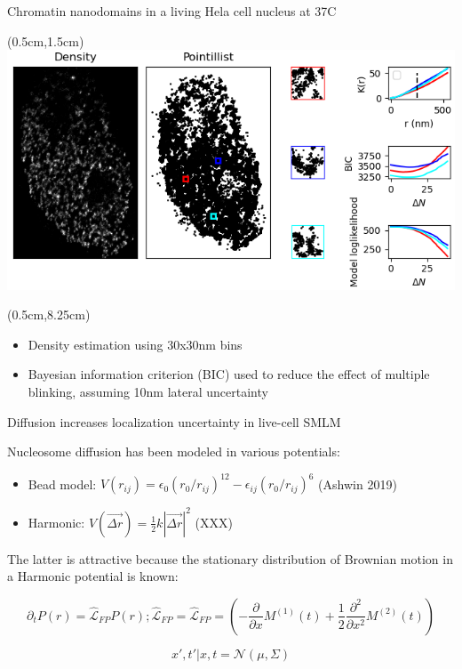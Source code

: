 \documentclass{beamer}					%
\begin{document}
\begin{frame}{Chromatin nanodomains in a living Hela cell nucleus at 37C}

\begin{textblock*}{13cm}(0.5cm,1.5cm)
\includegraphics[width=\textwidth]{Cluster.png}
\end{textblock*}

\begin{textblock*}{13cm}(0.5cm,8.25cm)
\begin{itemize}
\item Density estimation using 30x30nm bins
\item Bayesian information criterion (BIC) used to reduce the effect of multiple blinking, assuming 10nm lateral uncertainty
\end{itemize}
\end{textblock*}

\end{frame}

\begin{frame}{Diffusion increases localization uncertainty in live-cell SMLM}

Nucleosome diffusion has been modeled in various potentials:
\vspace{0.1in}
\begin{itemize}
\item Bead model: $V(r_{ij}) = \epsilon_{0}(r_{0}/r_{ij})^{12}-\epsilon_{ij}(r_{0}/r_{ij})^{6}$ (Ashwin 2019)
\item Harmonic: $V(\vec{\Delta r}) = \frac{1}{2}k|\vec{\Delta r}|^{2}$ (XXX)
\end{itemize}
\vspace{0.1in}
The latter is attractive because the stationary distribution of Brownian motion in a Harmonic potential is known:


\begin{equation*}
\partial_{t}P(r) = \hat{\mathcal{L}}_{FP}P(r); \hat{\mathcal{L}}_{FP} = \hat{\mathcal{L}}_{FP} = \left(-\frac{\partial}{\partial x}M^{(1)}(t) + \frac{1}{2}\frac{\partial^{2}}{\partial x^{2}}M^{(2)}(t)\right)
\end{equation*}


\begin{equation*}
x',t'|x,t = \mathcal{N}(\mu,\Sigma)
\end{equation*}

\end{frame}
\end{document}
